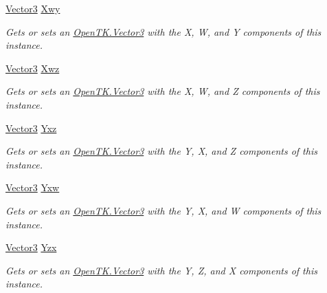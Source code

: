 \begin{DoxyCompactItemize}
\hyperlink{struct_open_t_k_1_1_vector3}{Vector3} \hyperlink{struct_open_t_k_1_1_vector4_ad7ab464b8656b0bdade7b3dfc832e057}{Xwy}
\begin{DoxyCompactList}\small\item\em Gets or sets an \hyperlink{struct_open_t_k_1_1_vector3}{Open\-T\-K.\-Vector3} with the X, W, and Y components of this instance. \end{DoxyCompactList}\item 
\hyperlink{struct_open_t_k_1_1_vector3}{Vector3} \hyperlink{struct_open_t_k_1_1_vector4_aec377931aad9bbeab017e5ed9b5c3f49}{Xwz}
\begin{DoxyCompactList}\small\item\em Gets or sets an \hyperlink{struct_open_t_k_1_1_vector3}{Open\-T\-K.\-Vector3} with the X, W, and Z components of this instance. \end{DoxyCompactList}\item 
\hyperlink{struct_open_t_k_1_1_vector3}{Vector3} \hyperlink{struct_open_t_k_1_1_vector4_afe3098c92a5d4ec77e9e7533baca2efe}{Yxz}
\begin{DoxyCompactList}\small\item\em Gets or sets an \hyperlink{struct_open_t_k_1_1_vector3}{Open\-T\-K.\-Vector3} with the Y, X, and Z components of this instance. \end{DoxyCompactList}\item 
\hyperlink{struct_open_t_k_1_1_vector3}{Vector3} \hyperlink{struct_open_t_k_1_1_vector4_a9fca4429b114e78a69519bf609ca622f}{Yxw}
\begin{DoxyCompactList}\small\item\em Gets or sets an \hyperlink{struct_open_t_k_1_1_vector3}{Open\-T\-K.\-Vector3} with the Y, X, and W components of this instance. \end{DoxyCompactList}\item 
\hyperlink{struct_open_t_k_1_1_vector3}{Vector3} \hyperlink{struct_open_t_k_1_1_vector4_ad06fbcc20926c5ad868c1e825819b6f9}{Yzx}
\begin{DoxyCompactList}\small\item\em Gets or sets an \hyperlink{struct_open_t_k_1_1_vector3}{Open\-T\-K.\-Vector3} with the Y, Z, and X components of this instance. \end{DoxyCompactList}\item 

\end{DoxyCompactItemize}
